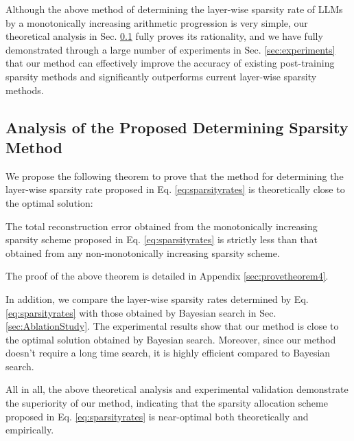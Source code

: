 Although the above method of determining the layer-wise sparsity rate of LLMs by a monotonically increasing arithmetic progression is very simple, our theoretical analysis in Sec. \ref{sec:AnalysisSparsityMethod} fully proves its rationality, and we have fully demonstrated through a large number of experiments in Sec. \ref{sec:experiments} that our method can effectively improve the accuracy of existing post-training sparsity methods and significantly outperforms current layer-wise sparsity methods.

\subsection{Analysis of the Proposed Determining Sparsity Method}\label{sec:AnalysisSparsityMethod}
We propose the following theorem to prove that the method for determining the layer-wise sparsity rate proposed in Eq. \ref{eq:sparsityrates} is theoretically close to the optimal solution:
\begin{theorem}\label{theorem4}
The total reconstruction error obtained from the monotonically increasing sparsity scheme proposed in Eq. \ref{eq:sparsityrates} is strictly less than that obtained from any non-monotonically increasing sparsity scheme.
\end{theorem}
The proof of the above theorem is detailed in Appendix \ref{sec:provetheorem4}. 

In addition, we compare the layer-wise sparsity rates determined by Eq. \ref{eq:sparsityrates} with those obtained by Bayesian search in Sec. \ref{sec:AblationStudy}. The experimental results show that our method is close to the optimal solution obtained by Bayesian search. Moreover, since our method doesn't require a long time search, it is highly efficient compared to Bayesian search.

All in all, the above theoretical analysis and experimental validation demonstrate the superiority of our method, indicating that the sparsity allocation scheme proposed in Eq. \ref{eq:sparsityrates} is near-optimal both theoretically and empirically.